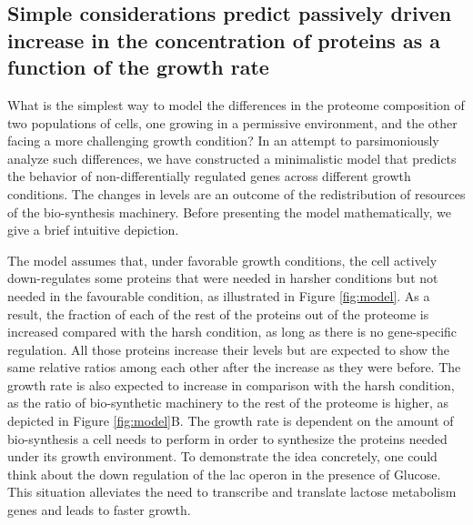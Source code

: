 \subsection{Simple considerations predict passively driven increase in the concentration of proteins as a function of the growth rate}
What is the simplest way to model the differences in the proteome composition of two populations of cells, one growing in a permissive environment, and the other facing a more challenging growth condition?
In an attempt to parsimoniously analyze such differences, we have constructed a minimalistic model that predicts the behavior of non-differentially regulated genes across different growth conditions. The changes in levels are an outcome of the redistribution of resources of the bio-synthesis machinery.
Before presenting the model mathematically, we give a brief intuitive depiction.

The model assumes that, under favorable growth conditions, the cell actively down-regulates some proteins that were needed in harsher conditions but not needed in the favourable condition, as illustrated in Figure \ref{fig:model}.
As a result, the fraction of each of the rest of the proteins out of the proteome is increased compared with the harsh condition, as long as there is no gene-specific regulation. All those proteins increase their levels but are expected to show the same relative ratios among each other after the increase as they were before. 
The growth rate is also expected to increase in comparison with the harsh condition, as the ratio of bio-synthetic machinery to the rest of the proteome is higher, as  depicted in Figure \ref{fig:model}B.
The growth rate is dependent on the amount of bio-synthesis a cell needs to perform in order to synthesize the proteins needed under its growth environment. 
To demonstrate the idea concretely, one could think about the down regulation of the lac operon in the presence of Glucose. This situation alleviates the need to transcribe and translate lactose metabolism genes and leads to faster growth.